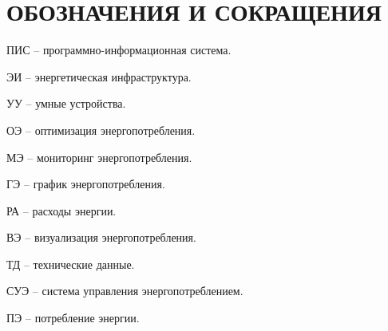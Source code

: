 \section*{ОБОЗНАЧЕНИЯ И СОКРАЩЕНИЯ}

ПИС -- программно-информационная система.

ЭИ -- энергетическая инфраструктура.

УУ -- умные устройства.

ОЭ -- оптимизация энергопотребления.

МЭ -- мониторинг энергопотребления.

ГЭ -- график энергопотребления.

РА -- расходы энергии.

ВЭ -- визуализация энергопотребления.

ТД -- технические данные.

СУЭ -- система управления энергопотреблением.

ПЭ -- потребление энергии.